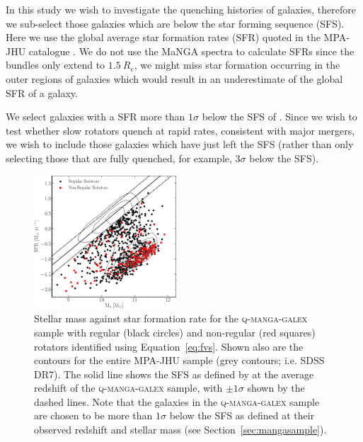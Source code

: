 \documentclass[useAMS,usenatbib]{mn2e}
\begin{document}
In this study we wish to investigate the quenching histories of galaxies, therefore we sub-select those galaxies which are below the star forming sequence (SFS). Here we use the global average star formation rates (SFR) quoted in the MPA-JHU catalogue \citep[][which are corrected for aperture bias]{kauffmann03, brinchmann04}. We do not use the MaNGA spectra to calculate SFRs since the bundles only extend to $1.5~R_e$, we might miss star formation occurring in the outer regions of galaxies which would result in an underestimate of the global SFR of a galaxy. 

We select galaxies with a SFR more than $1\sigma$ below the SFS of \cite{peng10}. Since we wish to test whether slow rotators quench at rapid rates, consistent with major mergers, we wish to include those galaxies which have just left the SFS (rather than only selecting those that are fully quenched, for example, $3\sigma$ below the SFS).

\begin{figure}
\centering
\includegraphics[width=0.475\textwidth]{../figures/MASS_SFR_FR_SR_VOR10_nonkdc.pdf}
\caption{Stellar mass against star formation rate for the \textsc{q-manga-galex} sample with regular (black circles) and non-regular (red squares) rotators identified using Equation~\ref{eq:fvs}. Shown also are the contours for the entire MPA-JHU sample (grey contours; i.e. SDSS DR7). The solid line shows the SFS as defined by \protect\cite{peng10} at the average redshift of the \textsc{q-manga-galex} sample, with $\pm 1 \sigma$ shown by the dashed lines. Note that the galaxies in the \textsc{q-manga-galex} sample are chosen to be more than $1\sigma$ below the SFS as defined at their observed redshift and stellar mass (see Section~\protect\ref{sec:mangasample}).}
\label{fig:masvsfr}
\end{figure}
\end{document}
